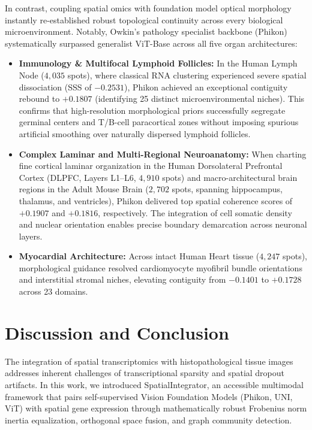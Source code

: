 \documentclass[11pt, a4paper]{article}
\begin{document}
In contrast, coupling spatial omics with foundation model optical morphology instantly re-established robust topological continuity across every biological microenvironment. Notably, Owkin's pathology specialist backbone (Phikon) systematically surpassed generalist ViT-Base across all five organ architectures:
\begin{itemize}
    \item \textbf{Immunology \& Multifocal Lymphoid Follicles:} In the Human Lymph Node ($4,035$ spots), where classical RNA clustering experienced severe spatial dissociation (SSS of $-0.2531$), Phikon achieved an exceptional contiguity rebound to $+0.1807$ (identifying 25 distinct microenvironmental niches). This confirms that high-resolution morphological priors successfully segregate germinal centers and T/B-cell paracortical zones without imposing spurious artificial smoothing over naturally dispersed lymphoid follicles.
    \item \textbf{Complex Laminar and Multi-Regional Neuroanatomy:} When charting fine cortical laminar organization in the Human Dorsolateral Prefrontal Cortex (DLPFC, Layers L1–L6, $4,910$ spots) and macro-architectural brain regions in the Adult Mouse Brain ($2,702$ spots, spanning hippocampus, thalamus, and ventricles), Phikon delivered top spatial coherence scores of $+0.1907$ and $+0.1816$, respectively. The integration of cell somatic density and nuclear orientation enables precise boundary demarcation across neuronal layers.
    \item \textbf{Myocardial Architecture:} Across intact Human Heart tissue ($4,247$ spots), morphological guidance resolved cardiomyocyte myofibril bundle orientations and interstitial stromal niches, elevating contiguity from $-0.1401$ to $+0.1728$ across 23 domains.
\end{itemize}

\section{Discussion and Conclusion}

The integration of spatial transcriptomics with histopathological tissue images addresses inherent challenges of transcriptional sparsity and spatial dropout artifacts. In this work, we introduced SpatialIntegrator, an accessible multimodal framework that pairs self-supervised Vision Foundation Models (Phikon, UNI, ViT) with spatial gene expression through mathematically robust Frobenius norm inertia equalization, orthogonal space fusion, and graph community detection.
\end{document}
